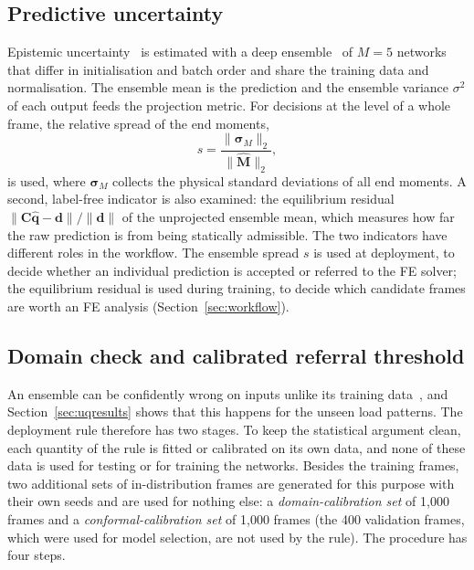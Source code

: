 \subsection{Predictive uncertainty}\label{sec:uq}
Epistemic uncertainty~\cite{derkiureghian2009aleatory} is estimated with a deep ensemble~\cite{lakshminarayanan2017ensembles} of $M=5$ networks that differ in initialisation and batch order and share the training data and normalisation. The ensemble mean is the prediction and the ensemble variance $\sigma^2$ of each output feeds the projection metric. For decisions at the level of a whole frame, the relative spread of the end moments,
\begin{equation}\label{eq:score}
s = \frac{\|\boldsymbol{\sigma}_M\|_2}{\|\hat{\mathbf{M}}\|_2},
\end{equation}
is used, where $\boldsymbol{\sigma}_M$ collects the physical standard deviations of all end moments. A second, label-free indicator is also examined: the equilibrium residual $\|\mathbf{C}\hat{\mathbf{q}}-\mathbf{d}\|/\|\mathbf{d}\|$ of the unprojected ensemble mean, which measures how far the raw prediction is from being statically admissible. The two indicators have different roles in the workflow. The ensemble spread $s$ is used at deployment, to decide whether an individual prediction is accepted or referred to the FE solver; the equilibrium residual is used during training, to decide which candidate frames are worth an FE analysis (Section~\ref{sec:workflow}).

\subsection{Domain check and calibrated referral threshold}\label{sec:ood}
An ensemble can be confidently wrong on inputs unlike its training data~\cite{ovadia2019shift}, and Section~\ref{sec:uqresults} shows that this happens for the unseen load patterns. The deployment rule therefore has two stages. To keep the statistical argument clean, each quantity of the rule is fitted or calibrated on its own data, and none of these data is used for testing or for training the networks. Besides the training frames, two additional sets of in-distribution frames are generated for this purpose with their own seeds and are used for nothing else: a \emph{domain-calibration set} of 1{,}000 frames and a \emph{conformal-calibration set} of 1{,}000 frames (the 400 validation frames, which were used for model selection, are not used by the rule). The procedure has four steps.

